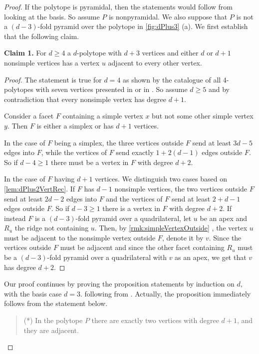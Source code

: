 \documentclass[a4paper]{amsart}
\theoremstyle{definition}
\theoremstyle{remark}
\begin{document}
\begin{proof}  If the polytope is pyramidal, then the statements would follow from looking at the basis. So  assume $P$ is nonpyramidal.  We also suppose that $P$ is not a $(d-3)$-fold pyramid over the polytope in \cref{fig:dPlus3} (a). We first establish that the following claim.

{\bf Claim 1.} For $d\ge4$ a $d$-polytope with $d+3$ vertices and either $d$ or $d+1$ nonsimple vertices has a vertex $u$ adjacent to every other vertex.

\begin{proof} The statement is true for $d=4$ as shown by the catalogue of all 4-polytopes with seven vertices presented  in \cite{FukMiyMor13a}  or in \cite[Fig.~5]{Gru70}. So assume $d\ge 5$ and by contradiction that every nonsimple vertex has degree $d+1$.

 Consider a facet $F$ containing a simple vertex $x$  but not some other simple vertex $y$. Then $F$ is either a simplex or has $d+1$ vertices.

In the case of $F$ being a simplex, the three vertices outside $F$ send at least $3d-5$ edges into $F$, while the vertices of $F$ send exactly $1+2(d-1)$ edges outside $F$. So if $d-4\ge1$ there must be a vertex in $F$ with degree $d+2$. 

In the case of $F$ having $d+1$ vertices. We distinguish two cases based on \cref{lem:dPlus2VertRec}. If $F$ has $d-1$ nonsimple vertices, the two vertices outside $F$ send at least $2d-2$ edges into $F$ and the vertices of $F$ send at least $2+d-1$ edges outside $F$. So if $d-3\ge1$ there is a vertex in $F$ with degree $d+2$.  If instead $F$ is a $(d-3)$-fold pyramid over a quadrilateral, let $u$ be an apex and $R_u$ the ridge not containing $u$. Then, by \cref{rmk:simpleVertexOutside} , the vertex $u$ must be adjacent to 
the nonsimple vertex outside $F$, denote it by $v$. Since the vertices outside $F$ must be adjacent and since  the other facet containing $R_u$ must be a $(d-3)$-fold pyramid over a quadrilateral with $v$ as an apex, we get that $v$ has degree $d+2$. 
\end{proof}
	  
Our proof continues by proving the proposition statements by induction on $d$, with the basis case $d=3$. following from \cite[Fig.~3]{BriDun73}. Actually, the proposition immediately follows from the statement below.
\begin{quote}
(*) In the polytope $P$ there are exactly two vertices with degree $d+1$, and they are adjacent. 
\end{quote}


\end{proof}
\end{document}
